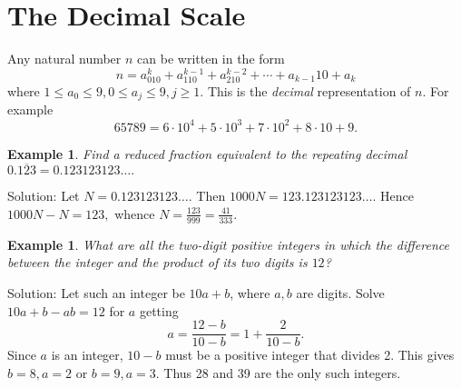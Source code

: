 \documentclass[11pt, openany]{book}
\theoremstyle{change} \theoremheaderfont{\blue\sffamily\bfseries}
\newtheorem{exa}[thm]{Example}
\theoremstyle{nonumberplain} \theoremheaderfont{\sffamily\bfseries}
\newcommand{\dis}{\displaystyle}
\newcommand{\í}{\'{\i}}
\begin{document}
\section{The Decimal Scale} Any natural number $n$
can be written in the form
$$
n = a_010^k + a_110^{k - 1} + a_210^{k - 2} + \cdots + a_{k - 1}10
+ a_k
$$
where $1 \leq a_0 \leq 9, 0 \leq a_j \leq 9, j \geq 1.$ This is
the {\em decimal} representation of $n$. For example
$$65789 =
6\cdot 10^4 + 5\cdot 10^3 + 7 \cdot 10^2 + 8 \cdot 10 + 9.$$
\begin{exa}
Find a reduced fraction equivalent to the repeating decimal
$0.\overline{123} = 0.123123123\ldots .$
\end{exa}
Solution: Let $N = 0.123123123\ldots.$ Then $1000N =
123.123123123\ldots .$ Hence $1000N - N = 123,$ whence $\dis{N =
\frac{123}{999} = \frac{41}{333}}$.
\begin{exa}
What are all the two-digit positive integers in which the
difference between the integer and the product of its two digits
is $12$?
\end{exa}
Solution: Let such an integer be $10a + b$, where $a, b$ are
digits. Solve $10a + b - ab = 12$ for $a$ getting $$a = \frac{12 -
b}{10 - b} = 1 + \frac{2}{10 - b}.$$Since $a$ is an integer, $10 -
b$ must be a positive integer that divides 2. This gives  $b = 8,
a = 2$ or $b  = 9, a = 3.$ Thus 28 and 39 are the only such
integers.
\end{document}

